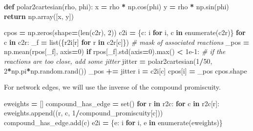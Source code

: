 \documentclass[
]{book}
\newenvironment{Shaded}{\begin{snugshade}}{\end{snugshade}}
\newcommand{\BuiltInTok}[1]{#1}
\newcommand{\CommentTok}[1]{\textcolor[rgb]{0.56,0.35,0.01}{\textit{#1}}}
\newcommand{\ControlFlowTok}[1]{\textcolor[rgb]{0.13,0.29,0.53}{\textbf{#1}}}
\newcommand{\DecValTok}[1]{\textcolor[rgb]{0.00,0.00,0.81}{#1}}
\newcommand{\FloatTok}[1]{\textcolor[rgb]{0.00,0.00,0.81}{#1}}
\newcommand{\KeywordTok}[1]{\textcolor[rgb]{0.13,0.29,0.53}{\textbf{#1}}}
\newcommand{\NormalTok}[1]{#1}
\newcommand{\OperatorTok}[1]{\textcolor[rgb]{0.81,0.36,0.00}{\textbf{#1}}}
\begin{document}
\begin{Shaded}
\begin{Highlighting}[numbers=left,,]
\KeywordTok{def}\NormalTok{ polar2cartesian(rho, phi):}
\NormalTok{    x }\OperatorTok{=}\NormalTok{ rho }\OperatorTok{*}\NormalTok{ np.cos(phi)}
\NormalTok{    y }\OperatorTok{=}\NormalTok{ rho }\OperatorTok{*}\NormalTok{ np.sin(phi)}
    \ControlFlowTok{return}\NormalTok{ np.array([x, y])}

\NormalTok{cpos }\OperatorTok{=}\NormalTok{ np.zeros(shape}\OperatorTok{=}\NormalTok{(}\BuiltInTok{len}\NormalTok{(c2r), }\DecValTok{2}\NormalTok{))}
\NormalTok{c2i }\OperatorTok{=}\NormalTok{ \{c: i }\ControlFlowTok{for}\NormalTok{ i, c }\KeywordTok{in} \BuiltInTok{enumerate}\NormalTok{(c2r)\}}
\ControlFlowTok{for}\NormalTok{ c }\KeywordTok{in}\NormalTok{ c2r:}
\NormalTok{    \_f }\OperatorTok{=} \BuiltInTok{list}\NormalTok{(\{r2i[r] }\ControlFlowTok{for}\NormalTok{ r }\KeywordTok{in}\NormalTok{ c2r[c]\}) }\CommentTok{\# mask of associated reactions}
\NormalTok{    \_pos }\OperatorTok{=}\NormalTok{ np.mean(rpos[\_f], axis}\OperatorTok{=}\DecValTok{0}\NormalTok{)}
    \ControlFlowTok{if}\NormalTok{ rpos[\_f].std(axis}\OperatorTok{=}\DecValTok{0}\NormalTok{).}\BuiltInTok{max}\NormalTok{() }\OperatorTok{\textless{}} \FloatTok{1e{-}1}\NormalTok{: }\CommentTok{\# if the reactions are too close, add some jitter}
\NormalTok{        jitter }\OperatorTok{=}\NormalTok{ polar2cartesian(}\DecValTok{1}\OperatorTok{/}\DecValTok{50}\NormalTok{, }\DecValTok{2}\OperatorTok{*}\NormalTok{np.pi}\OperatorTok{*}\NormalTok{np.random.rand())}
\NormalTok{        \_pos }\OperatorTok{+=}\NormalTok{ jitter}
\NormalTok{    i }\OperatorTok{=}\NormalTok{ c2i[c]}
\NormalTok{    cpos[i] }\OperatorTok{=}\NormalTok{ \_pos}
\NormalTok{cpos.shape}
\end{Highlighting}
\end{Shaded}

For network edges, we will use the inverse of the compound promiscuity.

\begin{Shaded}
\begin{Highlighting}[numbers=left,,]
\NormalTok{eweights }\OperatorTok{=}\NormalTok{ []}
\NormalTok{compound\_has\_edge }\OperatorTok{=} \BuiltInTok{set}\NormalTok{()}
\ControlFlowTok{for}\NormalTok{ r }\KeywordTok{in}\NormalTok{ r2c:}
    \ControlFlowTok{for}\NormalTok{ c }\KeywordTok{in}\NormalTok{ r2c[r]:}
\NormalTok{        eweights.append((r, c, }\DecValTok{1}\OperatorTok{/}\NormalTok{compound\_promiscuity[c]))}
\NormalTok{        compound\_has\_edge.add(c)}
\NormalTok{e2i }\OperatorTok{=}\NormalTok{ \{e: i }\ControlFlowTok{for}\NormalTok{ i, e }\KeywordTok{in} \BuiltInTok{enumerate}\NormalTok{(eweights)\}}
\end{Highlighting}
\end{Shaded}
\end{document}
